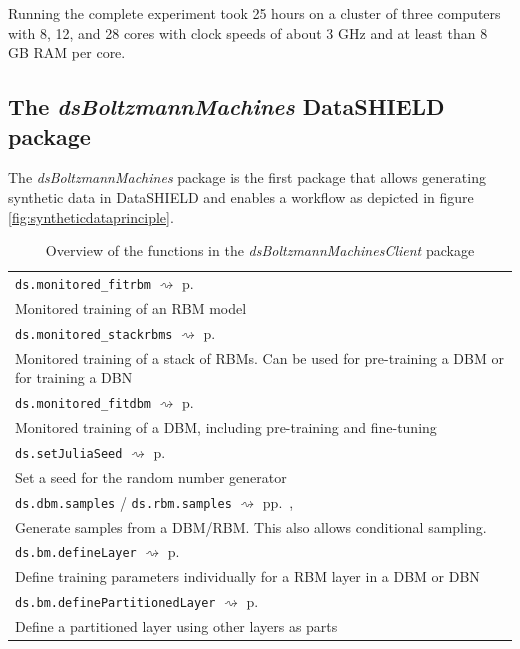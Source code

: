 \documentclass[12pt]{article}
\newcommand{\inlinecode}[1]{\texttt{#1}}
\newcommand{\apkg}[1]{\emph{#1}}
\newcommand{\rightpageref}[1]{\hfill $\rightsquigarrow$ p.\ \pageref{#1}}
\newcommand{\rightpagerefs}[2]{\hfill $\rightsquigarrow$ pp.\ \pageref{#1}, \pageref{#2}}
\begin{document}
Running the complete experiment took 25 hours on a cluster of three computers with 8, 12, and 28 cores with clock speeds of about 3 GHz and at least than 8 GB RAM per core.  
 
 
\FloatBarrier
\subsection{The \apkg{dsBoltzmannMachines} DataSHIELD package}


The \apkg{dsBoltzmannMachines} package is the first package that allows generating synthetic data in DataSHIELD and enables a workflow as depicted in figure \ref{fig:syntheticdataprinciple}.

\begin{table}[h]
\caption{Overview of the functions in the \apkg{dsBoltzmannMachinesClient} package}
\label{tab:dsBoltzmannFuns}
   \begin{tabularx}{\textwidth}{X}
   \Xhline{1pt}
\inlinecode{ds.monitored\_fitrbm} \rightpageref{rdokitem_ds.monitored.Rul.fitrbm} \\
Monitored training of an RBM model \\
\inlinecode{ds.monitored\_stackrbms} \rightpageref{rdokitem_ds.monitored.Rul.stackrbms} \\
Monitored training of a stack of RBMs. Can be used for pre-training a DBM or for training a DBN \\
\inlinecode{ds.monitored\_fitdbm} \rightpageref{rdokitem_ds.monitored.Rul.fitdbm} \\
Monitored training of a DBM, including pre-training and fine-tuning \\
\inlinecode{ds.setJuliaSeed} \rightpageref{rdokitem_ds.setJuliaSeed} \\
Set a seed for the random number generator \\
\inlinecode{ds.dbm.samples} / \inlinecode{ds.rbm.samples} \rightpagerefs{rdokitem_ds.dbm.samples}{rdokitem_ds.rbm.samples} \\
Generate samples from a DBM/RBM. 
This also allows conditional sampling.\\
\inlinecode{ds.bm.defineLayer} \rightpageref{rdokitem_ds.bm.defineLayer} \\
Define training parameters individually for a RBM layer in a DBM or DBN \\
\inlinecode{ds.bm.definePartitionedLayer} \rightpageref{rdokitem_ds.bm.definePartitionedLayer} \\
Define a partitioned layer using other layers as parts \\

\end{tabularx}
\end{table}
\end{document}
